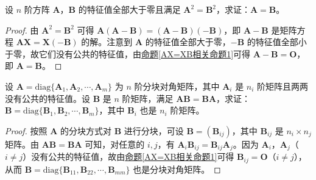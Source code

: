 \documentclass[../../main.tex]{subfiles}
\begin{document}
\begin{example}\label{example:分块准对角阵的块之间两两没有公共特征值则与其可交换的矩阵也有同样分块}
设 \(n\) 阶方阵 \(\boldsymbol{A}\)，\(\boldsymbol{B}\) 的特征值全部大于零且满足 \(\boldsymbol{A}^2 = \boldsymbol{B}^2\)，求证：\(\boldsymbol{A} = \boldsymbol{B}\)。
\end{example}
\begin{proof}
由 \(\boldsymbol{A}^2 = \boldsymbol{B}^2\) 可得 \(\boldsymbol{A}(\boldsymbol{A - B}) = (\boldsymbol{A - B})(-\boldsymbol{B})\)，即 \(\boldsymbol{A - B}\) 是矩阵方程 \(\boldsymbol{AX = X(-B)}\) 的解。注意到 \(\boldsymbol{A}\) 的特征值全部大于零，\(-\boldsymbol{B}\) 的特征值全部小于零，故它们没有公共的特征值，由\hyperref[AX=XB相关命题1]{命题\ref{AX=XB相关命题1}}可得 \(\boldsymbol{A - B} = \boldsymbol{O}\)，即 \(\boldsymbol{A} = \boldsymbol{B}\)。
\end{proof}

\begin{example}
设 \(\boldsymbol{A} = \mathrm{diag}\{\boldsymbol{A}_1,\boldsymbol{A}_2,\cdots,\boldsymbol{A}_m\}\) 为 \(n\) 阶分块对角矩阵，其中 \(\boldsymbol{A}_i\) 是 \(n_i\) 阶矩阵且两两没有公共的特征值。设 \(\boldsymbol{B}\) 是 \(n\) 阶矩阵，满足 \(\boldsymbol{AB = BA}\)，求证：\(\boldsymbol{B} = \mathrm{diag}\{\boldsymbol{B}_1,\boldsymbol{B}_2,\cdots,\boldsymbol{B}_m\}\)，其中 \(\boldsymbol{B}_i\) 也是 \(n_i\) 阶矩阵。
\end{example}
\begin{proof}
按照 \(\boldsymbol{A}\) 的分块方式对 \(\boldsymbol{B}\) 进行分块，可设 \(\boldsymbol{B} = (\boldsymbol{B}_{ij})\)，其中 \(\boldsymbol{B}_{ij}\) 是 \(n_i\times n_j\) 矩阵。由 \(\boldsymbol{AB = BA}\) 可知，对任意的 \(i,j\)，有 \(\boldsymbol{A}_i\boldsymbol{B}_{ij} = \boldsymbol{B}_{ij}\boldsymbol{A}_j\)。因为 \(\boldsymbol{A}_i\)，\(\boldsymbol{A}_j\)（\(i\neq j\)）没有公共的特征值，故由\hyperref[AX=XB相关命题1]{命题\ref{AX=XB相关命题1}}可得 \(\boldsymbol{B}_{ij} = \boldsymbol{O}\)（\(i\neq j\)），从而 \(\boldsymbol{B} = \mathrm{diag}\{\boldsymbol{B}_{11},\boldsymbol{B}_{22},\cdots,\boldsymbol{B}_{mm}\}\) 也是分块对角矩阵。
\end{proof}
\end{document}
